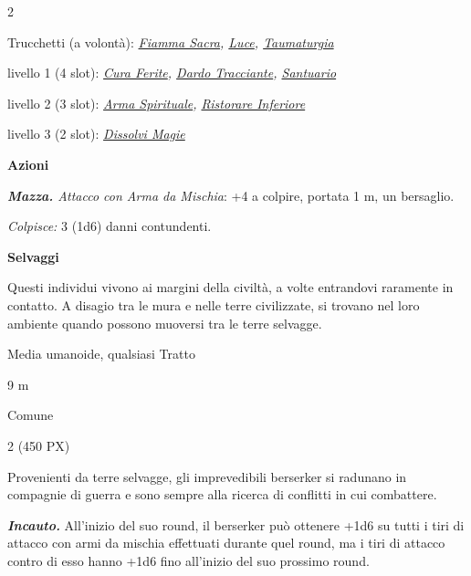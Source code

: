 \begin{multicols}{2}
{Trucchetti (a volontà): \emph{\hyperlink{Fiamma Sacra}{Fiamma Sacra}, \hyperlink{Luce}{Luce}, \hyperlink{Taumaturgia}{Taumaturgia}}

livello 1 (4 slot): \emph{\hyperlink{Cura Ferite}{Cura Ferite}, \hyperlink{Dardo Tracciante}{Dardo Tracciante}, \hyperlink{Santuario}{Santuario}}

livello 2 (3 slot): \emph{\hyperlink{Arma Spirituale}{Arma Spirituale}, \hyperlink{Ristorare Inferiore}{Ristorare Inferiore}}

livello 3 (2 slot): \emph{\hyperlink{Dissolvi Magie}{Dissolvi Magie}}

\textbf{Azioni}

\emph{\textbf{Mazza.} Attacco con Arma da Mischia}: +4 a colpire, portata 1 m, un bersaglio.

\emph{Colpisce:} 3 (1d6) danni contundenti.

\medskip\textbf{Selvaggi}

Questi individui vivono ai margini della civiltà, a volte entrandovi raramente in contatto. A disagio tra le mura e nelle terre civilizzate, si trovano nel loro ambiente quando possono muoversi tra le terre selvagge.

\begin{description}[noitemsep, topsep=0pt, parsep=0pt, partopsep=0pt, itemsep=1pt, leftmargin=2.35cm,  labelwidth=2.2cm, itemindent=0cm, listparindent=0pt] %
\setlength{\baselineskip}{10pt}
\item[\textbf{Taglia/Tipo}] Media umanoide, qualsiasi Tratto
\item[\textbf{Caratt.}] 
\item[\textbf{Punti Ferita}] 
\item[\textbf{Tiri Salvez.}] 
\item[\textbf{Movimento}] 9 m
\item[\textbf{Linguaggi}] Comune
\item[\textbf{Sfida}] 2 (450 PX)
\end{description}
\smallskip

Provenienti da terre selvagge, gli imprevedibili berserker si radunano in compagnie di guerra e sono sempre alla ricerca di conflitti in cui combattere.

\emph{\textbf{Incauto.}} All'inizio del suo round, il berserker può ottenere +1d6 su tutti i tiri di attacco con armi da mischia effettuati durante quel round, ma i tiri di attacco contro di esso hanno +1d6 fino all'inizio del suo prossimo round.

}
\end{multicols}
